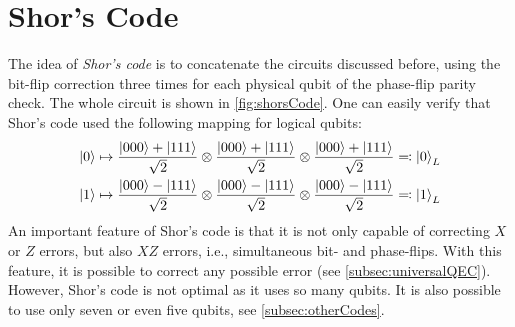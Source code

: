 	\section{Shor's Code}
		The idea of \emph{Shor's code} is to concatenate the circuits discussed before, using the bit-flip correction three times for each physical qubit of the phase-flip parity check. The whole circuit is shown in \autoref{fig:shorsCode}. One can easily verify that Shor's code used the following mapping for logical qubits:
		\begin{equation}
			\begin{aligned}
				\ket{0} &\mapsto \frac{\ket{000} + \ket{111}}{\sqrt{2}} \otimes \frac{\ket{000} + \ket{111}}{\sqrt{2}} \otimes \frac{\ket{000} + \ket{111}}{\sqrt{2}} \eqqcolon \ket{0}_L \\
				\ket{1} &\mapsto \frac{\ket{000} - \ket{111}}{\sqrt{2}} \otimes \frac{\ket{000} - \ket{111}}{\sqrt{2}} \otimes \frac{\ket{000} - \ket{111}}{\sqrt{2}} \eqqcolon \ket{1}_L
			\end{aligned}
			\label{eq:shorCode}
		\end{equation}
		An important feature of Shor's code is that it is not only capable of correcting \(X\) or \(Z\) errors, but also \(XZ\) errors, i.e., simultaneous bit- and phase-flips. With this feature, it is possible to correct any possible error (see \autoref{subsec:universalQEC}). However, Shor's code is not optimal as it uses so many qubits. It is also possible to use only seven or even five qubits, see \autoref{subsec:otherCodes}.

